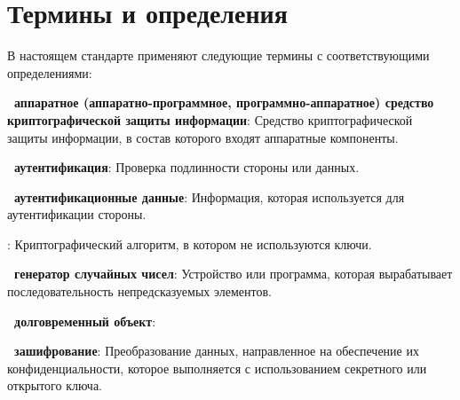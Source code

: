 \chapter{Термины и определения}\label{TERMS}

В настоящем стандарте применяют  
%
%
следующие термины с соответствующими определениями:

{\bf \thedefctr~аппаратное (аппаратно-программное, 
программно-аппаратное) средство криптографической защиты информации}:
Средство криптографической защиты информации, в состав которого входят 
аппаратные компоненты. 

{\bf \thedefctr~аутентификация}:
Проверка подлинности стороны или данных.


%
%

{\bf \thedefctr~аутентификационные данные}:
Информация, которая используется для аутентификации стороны.


:
Криптографический алгоритм, в котором не используются ключи.


{\bf \thedefctr~генератор случайных чисел}:
Устройство или программа, которая вырабатывает последовательность 
непредсказуемых элементов.


{\bf \thedefctr~долговременный объект}:


{\bf \thedefctr~зашифрование}:
Преобразование данных, направленное на обеспечение их конфиденциальности,
которое выполняется с использованием секретного или открытого ключа.

